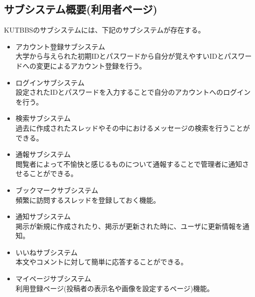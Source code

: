 \documentclass[a4j]{jarticle}
\begin{document}
\subsection{サブシステム概要(利用者ページ)}
KUTBBSのサブシステムには、下記のサブシステムが存在する。
\begin{itemize}
\item アカウント登録サブシステム\\
大学から与えられた初期IDとパスワードから自分が覚えやすいIDとパスワードへの変更によるアカウント登録を行う。

\item ログインサブシステム\\
設定されたIDとパスワードを入力することで自分のアカウントへのログインを行う。

\item 検索サブシステム\\
過去に作成されたスレッドやその中におけるメッセージの検索を行うことができる。

\item 通報サブシステム\\
閲覧者によって不愉快と感じるものについて通報することで管理者に通知させることができる。

\item ブックマークサブシステム\\
頻繁に訪問するスレッドを登録しておく機能。

\item 通知サブシステム\\
掲示が新規に作成されたり、掲示が更新された時に、ユーザに更新情報を通知。

\item いいねサブシステム\\
本文やコメントに対して簡単に応答することができる。

\item マイページサブシステム\\
利用登録ページ(投稿者の表示名や画像を設定するページ)機能。
\end{itemize}
\end{document}
